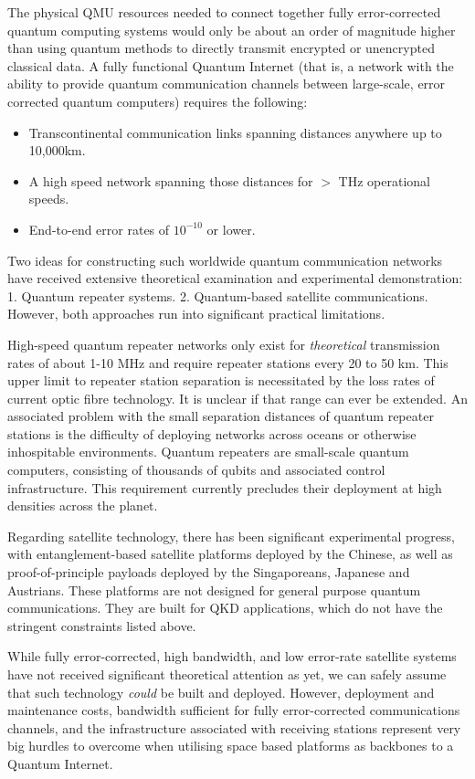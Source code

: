 \documentclass[twocolumn, aps, rmp, amsmath, amssymb, nofootinbib, superscriptaddress, longbibliography, floatfix, table-of-contents, eqsecnum]{revtex4-2}
\begin{document}
The physical QMU resources needed to connect together fully error-corrected quantum computing systems would only be about an order of magnitude higher than using quantum methods to directly transmit encrypted or unencrypted classical data. A fully functional Quantum Internet (that is, a network with the ability to provide quantum communication channels between large-scale, error corrected quantum computers) requires the following:
\begin{itemize}
\item Transcontinental communication links spanning distances anywhere up to 10,000km.
\item A high speed network spanning those distances for $>$ THz operational speeds.
\item End-to-end error rates of $10^{-10}$ or lower.
\end{itemize}

Two ideas for constructing such worldwide quantum communication networks have received extensive theoretical examination and experimental demonstration: 1. Quantum repeater systems. 2. Quantum-based satellite communications. However, both approaches run into significant practical limitations.

High-speed quantum repeater networks only exist for \textit{theoretical} transmission rates of about 1-10 MHz and require repeater stations every 20 to 50 km. This upper limit to repeater station separation is necessitated by the loss rates of current optic fibre technology. It is unclear if that range can ever be extended. An associated problem with the small separation distances of quantum repeater stations is the difficulty of deploying networks across oceans or otherwise inhospitable environments. Quantum repeaters are small-scale quantum computers, consisting of thousands of qubits and associated control infrastructure. This requirement currently precludes their deployment at high densities across the planet. 

Regarding satellite technology, there has been significant experimental progress, with entanglement-based satellite platforms deployed by the Chinese, as well as proof-of-principle payloads deployed by the Singaporeans, Japanese and Austrians. These platforms are not designed for general purpose quantum communications. They are built for QKD applications, which do not have the stringent constraints listed above. 

While fully error-corrected, high bandwidth, and low error-rate satellite systems have not received significant theoretical attention as yet, we can safely assume that such technology \textit{could} be built and deployed. However, deployment and maintenance costs, bandwidth sufficient for fully error-corrected communications channels, and the infrastructure associated with receiving stations represent very big hurdles to overcome when utilising space based platforms as backbones to a Quantum Internet. 
\end{document}
